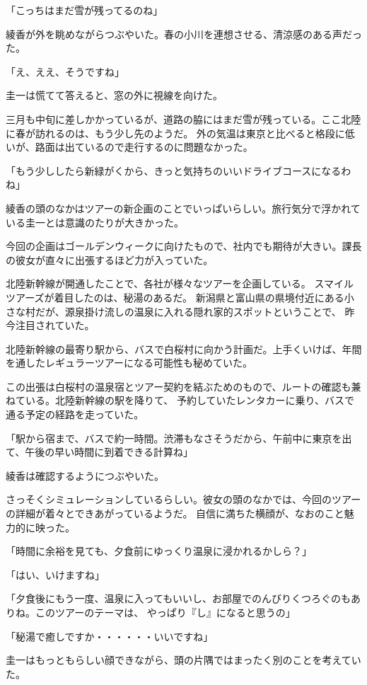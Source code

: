 ﻿\documentclass[book,tate]{jlreq}
\begin{document}
「こっちはまだ雪が残ってるのね」

綾香が外を眺めながらつぶやいた。春の小川を連想させる、清涼感のある声だった。

「え、ええ、そうですね」

圭一は慌てて答えると、窓の外に視線を向けた。

三月も中旬に差しかかっているが、道路の脇にはまだ雪が残っている。ここ北陸に春が訪れるのは、もう少し先のようだ。
外の気温は東京と比べると格段に低いが、路面は出ているので走行するのに問題なかった。

「もう少ししたら新緑がくから、きっと気持ちのいいドライブコースになるわね」

綾香の頭のなかはツアーの新企画のことでいっぱいらしい。旅行気分で浮かれている圭一とは意識のたりが大きかった。

今回の企画はゴールデンウィークに向けたもので、社内でも期待が大きい。課長の彼女が直々に出張するほど力が入っていた。

北陸新幹線が開通したことで、各社が様々なツアーを企画している。 スマイルツアーズが着目したのは、秘湯のあるだ。
新潟県と富山県の県境付近にある小さな村だが、源泉掛け流しの温泉に入れる隠れ家的スポットということで、 昨今注目されていた。

北陸新幹線の最寄り駅から、バスで白桜村に向かう計画だ。上手くいけば、年間を通したレギュラーツアーになる可能性も秘めていた。

この出張は白桜村の温泉宿とツアー契約を結ぶためのもので、ルートの確認も兼ねている。北陸新幹線の駅を降りて、
予約していたレンタカーに乗り、バスで通る予定の経路を走っていた。

「駅から宿まで、バスで約一時間。渋滞もなさそうだから、午前中に東京を出て、午後の早い時間に到着できる計算ね」

綾香は確認するようにつぶやいた。

さっそくシミュレーションしているらしい。彼女の頭のなかでは、今回のツアーの詳細が着々とできあがっているようだ。
自信に満ちた横顔が、なおのこと魅力的に映った。

「時間に余裕を見ても、夕食前にゆっくり温泉に浸かれるかしら？」

「はい、いけますね」

「夕食後にもう一度、温泉に入ってもいいし、お部屋でのんびりくつろぐのもありね。このツアーのテーマは、
やっぱり『し』になると思うの」

「秘湯で癒しですか・・・・・・いいですね」

圭一はもっともらしい顔できながら、頭の片隅ではまったく別のことを考えていた。
\end{document}
